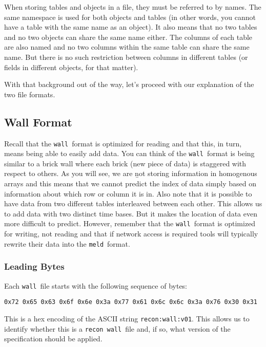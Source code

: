 \documentclass[11pt,a4paper,onecolumn]{article}
\newcommand{\recon}{\texttt{recon}}
\newcommand{\wall}{\texttt{wall}}
\newcommand{\meld}{\texttt{meld}}
\newcommand{\code}[1]{\texttt{#1}} %
\begin{document}
When storing tables and objects in a file, they must be referred to by
names.  The same namespace is used for both objects and tables (in
other words, you cannot have a table with the same name as an
object).  It also means that no two tables and no two objects can
share the same name either.  The columns of each table are also named
and no two columns within the same table can share the same name.  But
there is no such restriction between columns in different tables (or
fields in different objects, for that matter).

With that background out of the way, let's proceed with our
explanation of the two file formats.

\subsection{Wall Format}
\label{sec:wall_spec}

Recall that the \wall\ format is optimized for reading and that this,
in turn, means being able to easily add data.  You can think of the
\wall\ format is being similar to a brick wall where each brick (new
piece of data) is staggered with respect to others.  As you will see,
we are {\b not} storing information in homogenous arrays and this means
that we cannot predict the index of data simply based on information
about which row or column it is in.  Also note that it is possible to
have data from two different tables interleaved between each other.
This allows us to add data with two distinct time bases.  But it makes
the location of data even more difficult to predict.  However,
remember that the \wall\ format is optimized for writing, not reading
and that if network access is required tools will typically rewrite
their data into the \meld\ format.

\subsubsection{Leading Bytes}

Each \wall\ file starts with the following sequence of bytes:

\begin{verbatim}
0x72 0x65 0x63 0x6f 0x6e 0x3a 0x77 0x61 0x6c 0x6c 0x3a 0x76 0x30 0x31
\end{verbatim}

This is a hex encoding of the ASCII string \code{recon:wall:v01}.
This allows us to identify whether this is a \recon\ \wall\ file and, if
so, what version of the specification should be applied.
\end{document}
